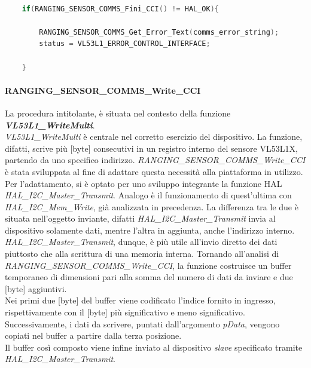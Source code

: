 \begin{lstlisting}[language=Cpp, caption={Dettaglio sull'invocazione di \textit{RANGING\_SENSOR\_COMMS\_Fini\_CCI} in \textit{VL53L1\_CommsClose}}]
    
    if(RANGING_SENSOR_COMMS_Fini_CCI() != HAL_OK){

        RANGING_SENSOR_COMMS_Get_Error_Text(comms_error_string);
        status = VL53L1_ERROR_CONTROL_INTERFACE;

    }
\end{lstlisting}

\paragraph{RANGING\_SENSOR\_COMMS\_Write\_CCI}
La procedura intitolante, è situata nel contesto della funzione \textbf{\textit{VL53L1\_WriteMulti}}.\\
\textit{VL53L1\_WriteMulti} è centrale nel corretto esercizio del dispositivo. La funzione, difatti, scrive più [byte] consecutivi in un registro interno del sensore VL53L1X, partendo da uno specifico indirizzo.
\textit{RANGING\_SENSOR\_COMMS\_Write\_CCI} è stata sviluppata al fine di adattare questa necessità alla piattaforma in utilizzo.\\
Per l'adattamento, si è optato per uno sviluppo integrante la funzione HAL\\\textit{HAL\_I2C\_Master\_Transmit}. Analogo è il funzionamento di quest'ultima con\\\textit{HAL\_I2C\_Mem\_Write}, già analizzata in precedenza.
La differenza tra le due è situata nell'oggetto inviante, difatti \textit{HAL\_I2C\_Master\_Transmit} invia al dispositivo solamente dati, mentre l'altra in aggiunta, anche l'indirizzo interno. \textit{HAL\_I2C\_Master\_Transmit}, dunque, è più utile all'invio diretto dei dati piuttosto che alla scrittura di una memoria interna.
Tornando all'analisi di \textit{RANGING\_SENSOR\_COMMS\_Write\_CCI}, la funzione costruisce un buffer temporaneo di dimensioni pari alla somma del numero di dati da inviare e due [byte] aggiuntivi.\\
Nei primi due [byte] del buffer viene codificato l'indice fornito in ingresso, rispettivamente con il [byte] più significativo e meno significativo.\\
Successivamente, i dati da scrivere, puntati dall'argomento \textit{pData}, vengono copiati nel buffer a partire dalla terza posizione.\\
Il buffer così composto viene infine inviato al dispositivo \textit{slave} specificato tramite\\\textit{HAL\_I2C\_Master\_Transmit}.
